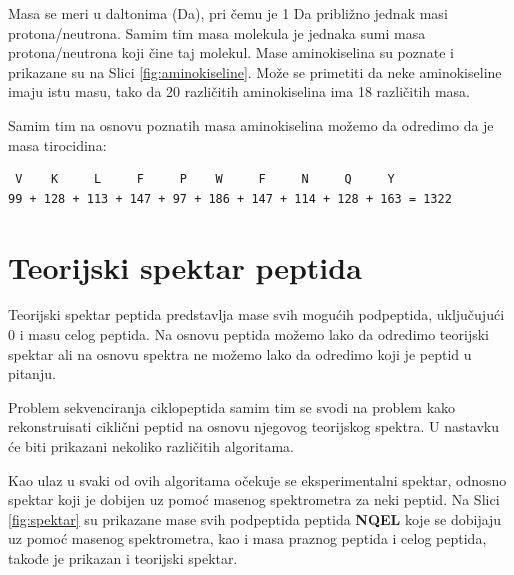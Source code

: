 \documentclass[12pt,oneside]{memoir}
\begin{document}
Masa se meri u daltonima (Da), pri čemu je 1 Da približno jednak masi protona/neutrona. Samim tim masa molekula je jednaka sumi masa protona/neutrona koji čine taj molekul. Mase aminokiselina su poznate i prikazane su na Slici \ref{fig:aminokiseline}. Može se primetiti da neke aminokiseline imaju istu masu, tako da 20 različitih aminokiselina ima 18 različitih masa.

Samim tim na osnovu poznatih masa aminokiselina možemo da odredimo da je masa tirocidina:
\begin{verbatim}
 V    K     L     F     P    W     F     N     Q     Y     
99 + 128 + 113 + 147 + 97 + 186 + 147 + 114 + 128 + 163 = 1322
\end{verbatim}

\section{Teorijski spektar peptida}
Teorijski spektar peptida predstavlja mase svih mogućih podpeptida, uključujući 0 i masu celog peptida. Na osnovu peptida možemo lako da odredimo teorijski spektar ali na osnovu spektra ne možemo lako da odredimo koji je peptid u pitanju.

Problem sekvenciranja ciklopeptida samim tim se svodi na problem kako rekonstruisati ciklični peptid na osnovu njegovog teorijskog spektra. U nastavku će biti prikazani nekoliko različitih algoritama.

Kao ulaz u svaki od ovih algoritama očekuje se eksperimentalni spektar, odnosno spektar koji je dobijen uz pomoć masenog spektrometra za neki peptid. Na Slici \ref{fig:spektar} su prikazane mase svih podpeptida peptida \textbf{NQEL} koje se dobijaju uz pomoć masenog spektrometra, kao i masa praznog peptida i celog peptida, takođe je prikazan i teorijski spektar.
\end{document}
